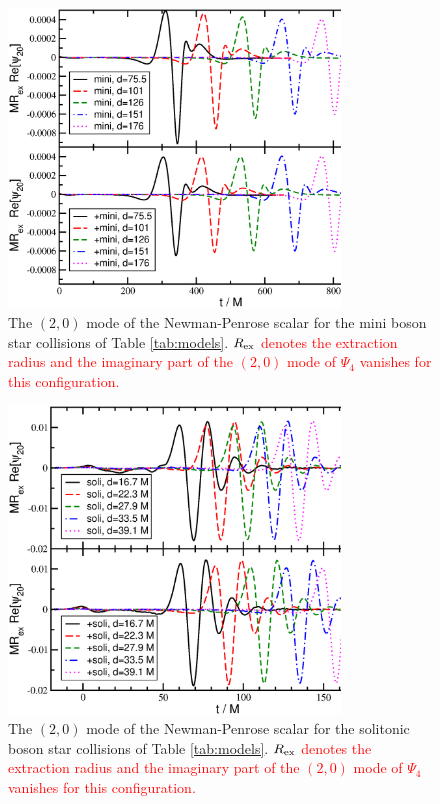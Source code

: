 \documentclass[]{iopart}
\newcommand{\new}[1]{\textcolor{red}{#1}}
\begin{document}
%
\begin{figure}
    \centering
    \includegraphics[width=250pt]{mini_psi20.eps}
    \caption{
    The $(2,0)$ mode of the Newman-Penrose scalar for the mini boson
    star collisions of Table \ref{tab:models}. \new{$R_{\rm ex}$
    denotes the extraction radius and the imaginary part of the
    $(2,0)$ mode of $\Psi_4$ vanishes for this configuration.}
    }
    \label{fig:mini_psi20}
\end{figure}
%
%
\begin{figure}
    \centering
    \includegraphics[width=250pt]{soli_psi20.eps}
    \caption{
    The $(2,0)$ mode of the Newman-Penrose scalar for the solitonic
    boson star collisions of Table \ref{tab:models}. \new{$R_{\rm ex}$
    denotes the extraction radius and the imaginary part of the
    $(2,0)$ mode of $\Psi_4$ vanishes for this configuration.}
    }
    \label{fig:soli_psi20}
\end{figure}
%

\end{document}
